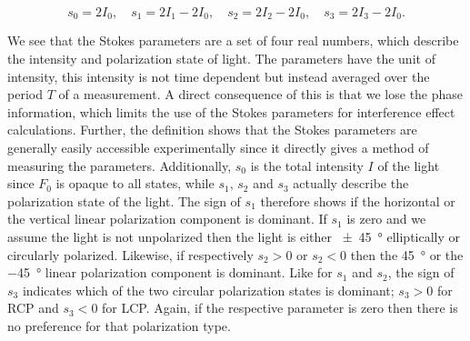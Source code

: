 \begin{equation}
    \label{eq:stokes_param_int}
    s_0 = 2 I_0, \quad 
    s_1 = 2 I_1 - 2 I_0, \quad 
    s_2 = 2 I_2 - 2 I_0, \quad 
    s_3 = 2 I_3 - 2 I_0.
\end{equation}

We see that the Stokes parameters are a set of four real numbers, which describe the intensity and polarization state of light. The parameters have the unit of intensity, this intensity is not time dependent but instead averaged over the period $T$ of a measurement. A direct consequence of this is that we lose the phase information, which limits the use of the Stokes parameters for interference effect calculations. Further, the definition shows that the Stokes parameters are generally easily accessible experimentally since it directly gives a method of measuring the parameters. Additionally, $s_0$ is the total intensity $I$ of the light since $F_0$ is opaque to all states, while $s_1$, $s_2$ and $s_3$ actually describe the polarization state of the light. The sign of $s_1$ therefore shows if the horizontal or the vertical linear polarization component is dominant. If $s_1$ is zero and we assume the light is not unpolarized then the light is either \SI{\pm 45}{\degree} elliptically or circularly polarized. Likewise, if respectively $s_2>0$ or $s_2<0$ then the \SI{45}{\degree} or the \SI{-45}{\degree} linear polarization component is dominant. Like for $s_1$ and $s_2$, the sign of $s_3$ indicates which of the two circular polarization states is dominant; $s_3>0$ for RCP and $s_3<0$ for LCP. Again, if the respective parameter is zero then there is no preference for that polarization type. 

